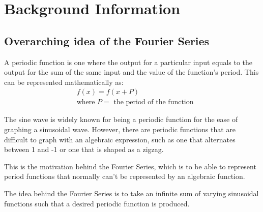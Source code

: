 \documentclass[letterpaper, 12pt]{article}
\begin{document}


\section{Background Information}

\subsection{Overarching idea of the Fourier Series} \label{sec:overarchingIdea}

A periodic function is one where the output for a particular input equals to
the output for the sum of the same input and the value of the function's period.
This can be represented mathematically as:
\begin{align*}
     & f(x) = f(x + P)
    \\
     & \text{where } P = \text{ the period of the function}
\end{align*}

The sine wave is widely known for being a periodic function for the ease of graphing
a sinusoidal wave. However, there are periodic functions that are difficult to
graph with an algebraic expression, such as one that alternates between
1 and -1 or one that is shaped as a zigzag.

This is the motivation behind the Fourier Series, which is to be able to represent
period functions that normally can't be represented by an algebraic function.

The idea behind the Fourier Series is to take an infinite sum of varying sinusoidal
functions such that a desired periodic function is produced.
\end{document}
